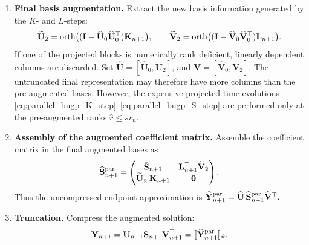 \documentclass[preprint,runningheads]{svjour3}
\newcommand\bfI{{\mathbf I}}
\newcommand\bfK{{\mathbf K}}
\newcommand\bfL{{\mathbf L}}
\newcommand\bfS{{\mathbf S}}
\newcommand\bfU{{\mathbf U}}
\newcommand\bfV{{\mathbf V}}
\newcommand\bfY{{\mathbf Y}}
\begin{document}
\begin{enumerate}
\item {\bf Final basis augmentation.}
Extract the new basis information generated by the $K$- and $L$-steps:
\[
    \widetilde\bfU_2
    =
    {\rm orth}
    \bigl((\bfI-\widehat\bfU_0\widehat\bfU_0^\top)\bfK_{n+1}\bigr),
    \qquad
    \widetilde\bfV_2
    =
    {\rm orth}
    \bigl((\bfI-\widehat\bfV_0\widehat\bfV_0^\top)\bfL_{n+1}\bigr).
\]
If one of the projected blocks is numerically rank deficient, linearly
dependent columns are discarded. Set
$
    \widehat\bfU=[\widehat\bfU_0,\widetilde\bfU_2]$, and $
    \widehat\bfV=[\widehat\bfV_0,\widetilde\bfV_2]
$. 
The untruncated final representation may therefore have more columns than the
pre-augmented bases. However, the expensive projected time evolutions
\eqref{eq:parallel_bugp_K_step}--\eqref{eq:parallel_bugp_S_step}
are performed only at the pre-augmented ranks $\hat{r}\le sr_n$.

\item {\bf Assembly of the augmented coefficient matrix.}
Assemble the coefficient matrix in the final augmented bases as
\begin{equation}
\label{eq:parallel_bugp_assembled_S}
    \widehat\bfS_{n+1}^{\rm par}
    =
    \begin{pmatrix}
        \bar{\bfS}_{n+1}
        &
        \bfL_{n+1}^\top\widetilde\bfV_2
        \\
        \widetilde\bfU_2^\top\bfK_{n+1}
        &
        \bf0
    \end{pmatrix}.
\end{equation}
Thus the uncompressed endpoint approximation is
$
    \widehat\bfY_{n+1}^{\rm par}
    =
    \widehat\bfU\,
    \widehat\bfS_{n+1}^{\rm par}
    \widehat\bfV^\top .
$

\item {\bf Truncation.}
Compress the augmented solution:
\[
    \bfY_{n+1}
    =
    \bfU_{n+1}\bfS_{n+1}\bfV_{n+1}^\top
    =
    [\![\widehat\bfY_{n+1}^{\rm par}]\!]_{\vartheta}.
\]
\end{enumerate}
\end{document}
